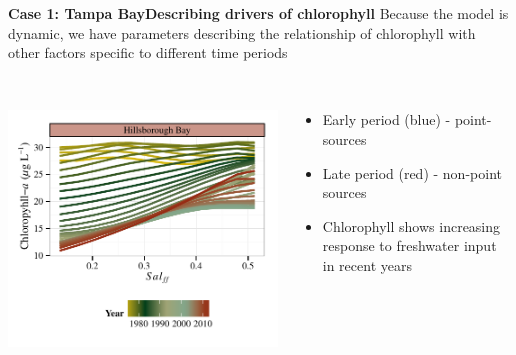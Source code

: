 \documentclass[serif]{beamer}\usepackage[]{graphicx}\usepackage[]{color}
\begin{document}
\begin{frame}{\textbf{Case 1: Tampa Bay}}{\textbf{Describing drivers of chlorophyll}}
Because the model is dynamic, we have parameters describing the relationship of chlorophyll with other factors specific to different time periods \\~\\
\begin{columns}[T]
\begin{column}{0.45\textwidth}
\centerline{\includegraphics[width = \textwidth]{fig/hill.pdf}}
\end{column}
\begin{column}{0.45\textwidth}
\begin{itemize}
\item Early period (blue) - point-sources
\item Late period (red) - non-point sources
\item Chlorophyll shows increasing response to freshwater input in recent years
\end{itemize}
\end{column}
\end{columns}
\end{frame}

\end{document}
